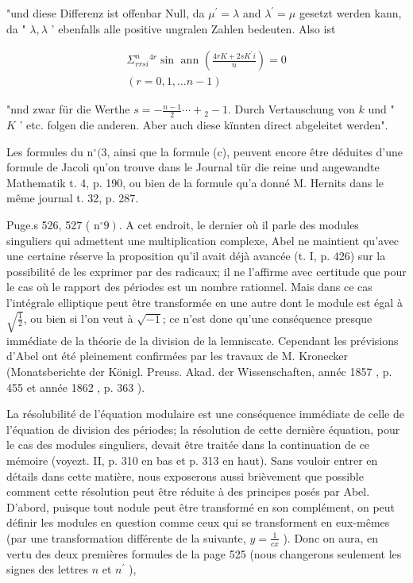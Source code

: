 \documentclass{article}
\begin{document}
"und diese Differenz ist offenbar Null, da \(\mu^{\prime}=\lambda\) and \(\lambda^{\prime}=\mu\) gesetzt werden kann, da " \(\lambda, \lambda\) ' ebenfalls alle positive ungralen Zahlen bedeuten. Also ist

\[
\begin{gathered}
\Sigma_{r r s i}^{n}{ }^{4 r} \sin \text { ann }\left(\frac{4 r K+2 s K^{\prime} i}{n}\right)=0 \\
(r=0,1, \ldots n-1)
\end{gathered}
\]

"nnd zwar für die Werthe \(s=-\frac{n-1}{2} \cdots+{ }_{2}-1\). Durch Vertauschung von \(k\) und " \(K\) ' etc. folgen die anderen. Aber auch diese kïnnten direct abgeleitet werden".

Les formules du \(\mathrm{n}^{\circ}(3\), ainsi que la formule (c), peuvent encore être déduites d'une formule de Jacoli qu'on trouve dans le Journal tür die reine und angewandte Mathematik t. 4, p. 190, ou bien de la formule qu'a donné M. Hernits dans le même journal t. 32, p. 287.

Puge.s 526, 527 ( \(\left.\mathrm{n}^{\circ} 9\right)\). A cet endroit, le dernier où il parle des modules singuliers qui admettent une multiplication complexe, Abel ne maintient qu'avec une certaine réserve la proposition qu'il avait déjà avancée (t. I, p. 426) sur la possibilité de les exprimer par des radicaux; il ne l'affirme avec certitude que pour le cas où le rapport des périodes est un nombre rationnel. Mais dans ce cas l'intégrale elliptique peut être transformée en une autre dont le module est égal à \(\sqrt{\frac{1}{2}}\), ou bien si l'on veut à \(\sqrt{-1}\); ce n'est done qu'une conséquence presque immédiate de la théorie de la division de la lemniscate. Cependant les prévisions d'Abel ont été pleinement confirmées par les travaux de M. Kronecker (Monatsberichte der Königl. Preuss. Akad. der Wissenschaften, annéc 1857 , p. 455 et année 1862 , p. 363 ).

La résolubilité de l'équation modulaire est une conséquence immédiate de celle de l'équation de division des périodes; la résolution de cette dernière équation, pour le cas des modules singuliers, devait être traitée dans la continuation de ce mémoire (voyezt. II, p. 310 en bas et p. 313 en haut). Sans vouloir entrer en détails dans cette matière, nous exposerons aussi brièvement que possible comment cette résolution peut être réduite à des principes posés par Abel. D'abord, puisque tout nodule peut être transformé en son complément, on peut définir les modules en question comme ceux qui se transforment en eux-mêmes (par une transformation différente de la suivante, \(y=\frac{1}{c x}\) ). Donc on aura, en vertu des deux premières formules de la page 525 (nous changerons seulement les signes des lettres \(n\) et \(n^{\prime}\) ),
\end{document}
